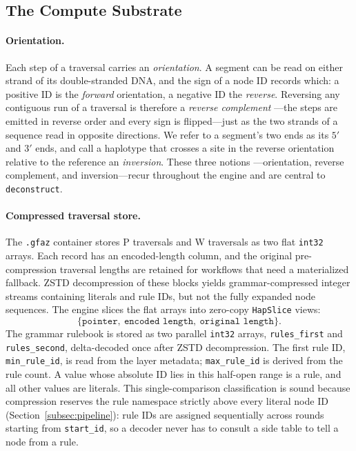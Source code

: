 \subsection{The Compute Substrate}\label{subsec:ce-model}

\paragraph{Orientation.}
Each step of a traversal carries an \emph{orientation}. A segment can be read on
either strand of its double-stranded DNA, and the sign of a node ID records which: a
positive ID is the \emph{forward} orientation, a negative ID the \emph{reverse}.
Reversing any contiguous run of a traversal is therefore a \emph{reverse complement}
---the steps are emitted in reverse order and every sign is flipped---just as the two
strands of a sequence read in opposite directions. We refer to a segment's two ends
as its $5'$ and $3'$ ends, and call a haplotype that crosses a site in the reverse
orientation relative to the reference an \emph{inversion}. These three notions
---orientation, reverse complement, and inversion---recur throughout the engine and
are central to \texttt{deconstruct}.

\paragraph{Compressed traversal store.}
The \texttt{.gfaz} container stores P traversals and W traversals as two flat
\texttt{int32} arrays. Each record has an encoded-length column, and the original
pre-compression traversal lengths are retained for workflows that need a
materialized fallback. ZSTD decompression of these blocks yields
grammar-compressed integer streams containing literals and rule IDs, but not the
fully expanded node sequences. The engine slices the flat arrays into zero-copy
\texttt{HapSlice} views:
\[
  \{\texttt{pointer},\ \texttt{encoded length},\ \texttt{original length}\}.
\]
The grammar rulebook is stored as two parallel \texttt{int32} arrays,
\texttt{rules\_first} and \texttt{rules\_second}, delta-decoded once after ZSTD
decompression. The first rule ID, \texttt{min\_rule\_id}, is read from the layer
metadata; \texttt{max\_rule\_id} is derived from the rule count. A value whose
absolute ID lies in this half-open range is a rule, and all other values are
literals. This single-comparison classification is sound because compression
reserves the rule namespace strictly above every literal node ID
(Section~\ref{subsec:pipeline}): rule IDs are assigned sequentially across rounds
starting from \texttt{start\_id}, so a decoder never has to consult a side table
to tell a node from a rule.

